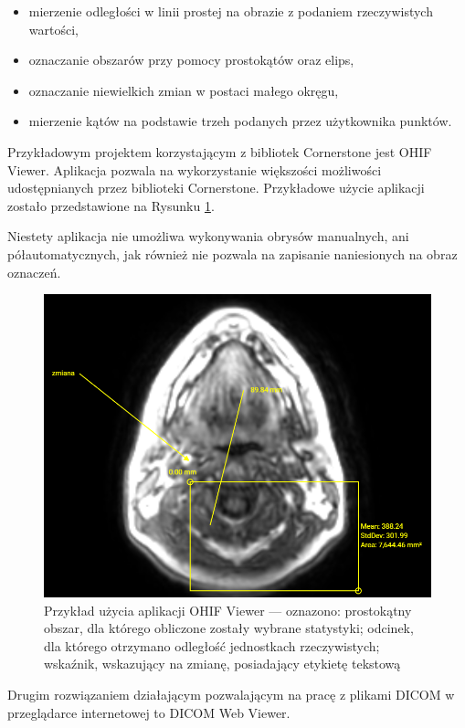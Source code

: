 \documentclass[a4paper,11pt,twoside,openright]{report}
\theoremstyle{definition}
\begin{document}
\begin{itemize}[noitemsep]
\item mierzenie odległości w linii prostej na obrazie z podaniem rzeczywistych wartości,
\item oznaczanie obszarów przy pomocy prostokątów oraz elips,
\item oznaczanie niewielkich zmian w postaci małego okręgu,
\item mierzenie kątów na podstawie trzeh podanych przez użytkownika punktów.
\end{itemize}

Przykładowym projektem korzystającym z bibliotek Cornerstone jest OHIF Viewer.
Aplikacja pozwala na wykorzystanie większości możliwości udostępnianych przez
biblioteki Cornerstone. Przykładowe użycie aplikacji zostało przedstawione na
Rysunku \ref{fig:OHIF-example}.

Niestety aplikacja nie umożliwa wykonywania obrysów manualnych, ani półautomatycznych,
jak również nie pozwala na zapisanie naniesionych na obraz oznaczeń.

\begin{figure}[t]
	\includegraphics[width=\textwidth]{OHIF-example}
	\caption{Przykład użycia aplikacji OHIF Viewer --- oznazono: prostokątny obszar,
	dla którego obliczone zostały wybrane statystyki; odcinek, dla którego otrzymano
	odległość jednostkach rzeczywistych; wskaźnik, wskazujący na zmianę, posiadający
	etykietę tekstową}
    	\label{fig:OHIF-example}
\end{figure}

Drugim rozwiązaniem działającym pozwalającym na pracę z plikami DICOM w przeglądarce
internetowej to DICOM Web Viewer.
\end{document}
